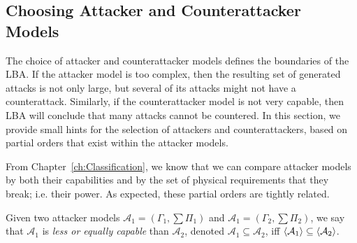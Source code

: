 {\subsection{Choosing Attacker and Counterattacker Models}
The choice of attacker and counterattacker models defines the boundaries of the LBA. If the attacker model is too complex, then the resulting set of generated attacks is not only large, but several of its attacks might not have a counterattack. Similarly, if the counterattacker model is not very capable, then LBA will conclude that many attacks cannot be countered. In this section, we provide small hints for the selection of attackers and counterattackers, based on partial orders that exist within the attacker models.

{From Chapter~\ref{ch:Classification}, w}e know that we can compare attacker models by both their capabilities and by the set of physical requirements that they break; i.e. their power. As expected, these partial orders are tightly related. 
\begin{definition}
  Given two attacker models $\mathcal{A}_1=(\Gamma_1,\sum \Pi_1)$ and $\mathcal{A}_1=(\Gamma_2,\sum \Pi_2)$, we say that $\mathcal{A}_1$ is \emph{less or equally capable} than $\mathcal{A}_2$, denoted $\mathcal{A}_1\subseteq \mathcal{A}_2$, iff ${{\left<\mathcal{A}_1\right>}}\subseteq {{\left<\mathcal{A}_2\right>}}$. 
  

\end{definition}}
